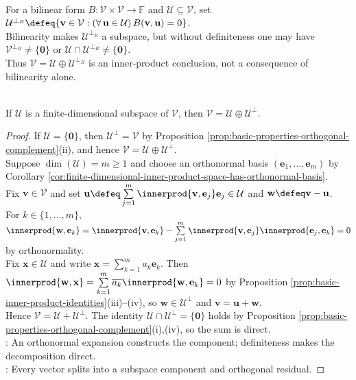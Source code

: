 \begin{remark} \label{rem:orthogonal-complements-definiteness-warning} \\
For a bilinear form $B:\mathcal{V}\times\mathcal{V}\to\mathbb{F}$ and $\mathcal{U}\subseteq\mathcal{V}$, set $\mathcal{U}^{\perp_B}\defeq\{\mathbf{v}\in\mathcal{V}:(\forall\,\mathbf{u}\in\mathcal{U})\,B(\mathbf{v},\mathbf{u})=0\}$.\\
Bilinearity makes $\mathcal{U}^{\perp_B}$ a subspace, but without definiteness one may have $\mathcal{V}^{\perp_B}\neq\{\mathbf{0}\}$ or $\mathcal{U}\cap\mathcal{U}^{\perp_B}\neq\{\mathbf{0}\}$.\\
Thus $\mathcal{V}=\mathcal{U}\oplus\mathcal{U}^{\perp_B}$ is an inner-product conclusion, not a consequence of bilinearity alone.
\end{remark}

\begin{theorem} \label{thm:orthogonal-direct-sum-decomposition} \\
If $\mathcal{U}$ is a finite-dimensional subspace of $\mathcal{V}$, then $\mathcal{V}=\mathcal{U}\oplus\mathcal{U}^{\perp}$.
\begin{proof}
If $\mathcal{U}=\{\mathbf{0}\}$, then $\mathcal{U}^{\perp}=\mathcal{V}$ by Proposition \ref{prop:basic-properties-orthogonal-complement}(ii), and hence $\mathcal{V}=\mathcal{U}\oplus\mathcal{U}^{\perp}$.\\
Suppose $\dim(\mathcal{U})=m\geq1$ and choose an orthonormal basis $(\mathbf{e}_1,\ldots,\mathbf{e}_m)$ by Corollary \ref{cor:finite-dimensional-inner-product-space-has-orthonormal-basis}.\\
Fix $\mathbf{v}\in\mathcal{V}$ and set $\mathbf{u}\defeq\sum\limits_{j=1}^{m}\innerprod{\mathbf{v},\mathbf{e}_j}\mathbf{e}_j\in\mathcal{U}$ and $\mathbf{w}\defeq\mathbf{v}-\mathbf{u}$.\\
For $k\in\{1,\ldots,m\}$, $\innerprod{\mathbf{w},\mathbf{e}_k}=\innerprod{\mathbf{v},\mathbf{e}_k}-\sum\limits_{j=1}^{m}\innerprod{\mathbf{v},\mathbf{e}_j}\innerprod{\mathbf{e}_j,\mathbf{e}_k}=0$ by orthonormality.\\
Fix $\mathbf{x}\in\mathcal{U}$ and write $\mathbf{x}=\sum\limits_{k=1}^{m}a_k\mathbf{e}_k$. Then $\innerprod{\mathbf{w},\mathbf{x}}=\sum\limits_{k=1}^{m}\overline{a_k}\innerprod{\mathbf{w},\mathbf{e}_k}=0$ by Proposition \ref{prop:basic-inner-product-identities}(iii)--(iv), so $\mathbf{w}\in\mathcal{U}^{\perp}$ and $\mathbf{v}=\mathbf{u}+\mathbf{w}$.\\
Hence $\mathcal{V}=\mathcal{U}+\mathcal{U}^{\perp}$. The identity $\mathcal{U}\cap\mathcal{U}^{\perp}=\{\mathbf{0}\}$ holds by Proposition \ref{prop:basic-properties-orthogonal-complement}(i),(iv), so the sum is direct.\\
: An orthonormal expansion constructs the component; definiteness makes the decomposition direct.\\
: Every vector splits into a subspace component and orthogonal residual.
\end{proof}
\end{theorem}

